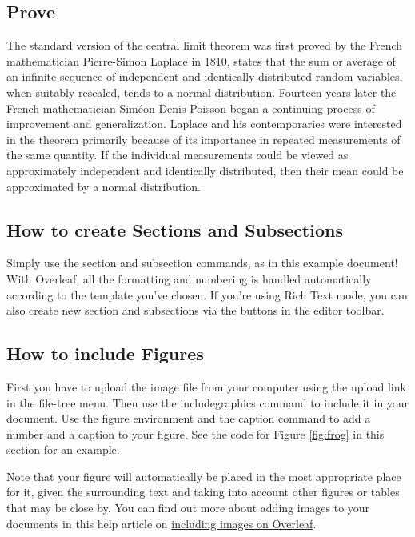 \documentclass{article}
\begin{document}
\subsection{Prove}
The standard version of the central limit theorem was first proved by the French mathematician Pierre-Simon Laplace in 1810, states that the sum or average of an infinite sequence of independent and identically distributed random variables, when suitably rescaled, tends to a normal distribution.
Fourteen years later the French mathematician Siméon-Denis Poisson began a continuing process of improvement and generalization.
Laplace and his contemporaries were interested in the theorem primarily because of its importance in repeated measurements of the same quantity. If the individual measurements could be viewed as approximately independent and identically distributed, then their mean could be approximated by a normal distribution.







\subsection{How to create Sections and Subsections}

  Simply use the section and subsection commands, as in this example document! With Overleaf, all the formatting and numbering is handled automatically according to the template you've chosen. If you're using Rich Text mode, you can also create new section and subsections via the buttons in the editor toolbar.

\subsection{How to include Figures}

First you have to upload the image file from your computer using the upload link in the file-tree menu. Then use the includegraphics command to include it in your document. Use the figure environment and the caption command to add a number and a caption to your figure. See the code for Figure \ref{fig:frog} in this section for an example.

Note that your figure will automatically be placed in the most appropriate place for it, given the surrounding text and taking into account other figures or tables that may be close by. You can find out more about adding images to your documents in this help article on \href{https://www.overleaf.com/learn/how-to/Including_images_on_Overleaf}{including images on Overleaf}.
\end{document}
